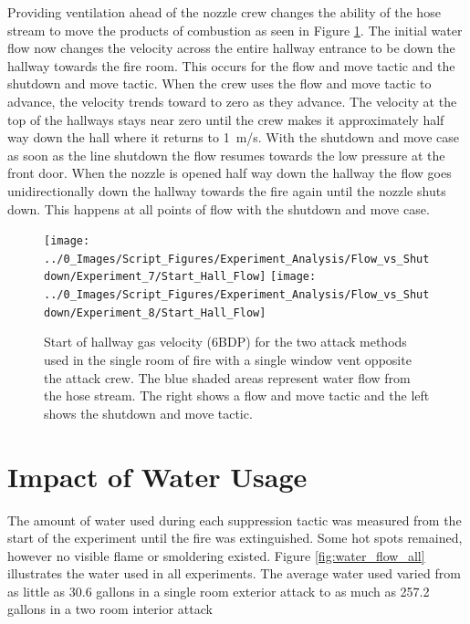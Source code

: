 \documentclass[12pt,oneside]{book}
\begin{document}
Providing ventilation ahead of the nozzle crew changes the ability of the hose stream to move the products of combustion as seen in Figure \ref{fig:Flow_vs_Shut_Single_Vent_Velocity}. The initial water flow now changes the velocity across the entire hallway entrance to be down the hallway towards the fire room. This occurs for the flow and move tactic and the shutdown and move tactic. When the crew uses the flow and move tactic to advance, the velocity trends toward to zero as they advance. The velocity at the top of the hallways stays near zero until the crew makes it approximately half way down the hall where it returns to 1~m/s. With the shutdown and move case as soon as the line shutdown the flow resumes towards the low pressure at the front door. When the nozzle is opened half way down the hallway the flow goes unidirectionally down the hallway towards the fire again until the nozzle shuts down. This happens at all points of flow with the shutdown and move case.

\begin{figure}[H]
\centering
\texttt{[image: ../0\_Images/Script\_Figures/Experiment\_Analysis/Flow\_vs\_Shutdown/Experiment\_7/Start\_Hall\_Flow]}
\texttt{[image: ../0\_Images/Script\_Figures/Experiment\_Analysis/Flow\_vs\_Shutdown/Experiment\_8/Start\_Hall\_Flow]}
\caption[Single Room - Window Vent Opposite - Flow \& Move vs. Shutdown \& Move - Airflow]{Start of hallway gas velocity (6BDP) for the two attack methods used in the single room of fire with a single window vent opposite the attack crew. The blue shaded areas represent water flow from the hose stream. The right shows a flow and move tactic and the left shows the shutdown and move tactic.}
\label{fig:Flow_vs_Shut_Single_Vent_Velocity}
\end{figure}


\section{Impact of Water Usage}
The amount of water used during each suppression tactic was measured from the start of the experiment until the fire was extinguished. Some hot spots remained, however no visible flame or smoldering existed. Figure \ref{fig:water_flow_all} illustrates the water used in all experiments. The average water used varied from as little as 30.6 gallons in a single room exterior attack to as much as 257.2 gallons in a two room interior attack
\end{document}
